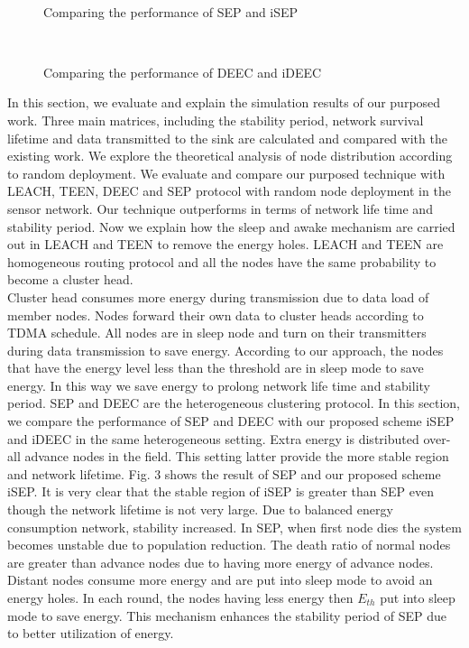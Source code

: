 \documentclass{article}
\begin{document}
\begin{figure}
\centering
\mbox{\quad
{}}
\caption{Comparing the performance of SEP and iSEP} \label{fig12}
\end{figure}
\begin{figure}
\centering
\mbox{\quad
{}}
\caption{Comparing the performance of DEEC and iDEEC} \label{fig12}
\end{figure}
In this section, we evaluate and explain the simulation results of our purposed work. Three main matrices, including the stability period, network survival lifetime and data transmitted to the sink are calculated and compared with the existing work. We explore the theoretical analysis of node distribution according to random deployment. We evaluate and compare our purposed technique with LEACH, TEEN, DEEC and SEP protocol with random node deployment in the sensor network. Our technique outperforms in terms of network life time and stability period. Now we explain how the sleep and awake mechanism are carried out in LEACH and TEEN to remove the energy holes. LEACH and TEEN are homogeneous routing protocol and all the nodes have the same probability to become a cluster head. \\Cluster head consumes more energy during transmission due to data load of member nodes. Nodes forward their own data to cluster heads according to TDMA schedule. All nodes are in sleep node and turn on their transmitters during data transmission to save energy. According to our approach, the nodes that have the energy level less than the threshold are in sleep mode to save energy. In this way we save energy to prolong network life time and stability period.
SEP and DEEC are the heterogeneous clustering protocol. In this section, we compare the performance of SEP and DEEC with our proposed scheme iSEP and iDEEC in the same heterogeneous setting. Extra energy is distributed over-all advance nodes in the field. This setting latter provide the more stable region and network lifetime. Fig. 3 shows the result of SEP and our proposed scheme iSEP. It is very clear that the stable region of iSEP is greater than SEP even though the network lifetime is not very large. Due to balanced energy consumption network, stability increased. In SEP, when first node dies the system becomes unstable due to population reduction. The death ratio of normal nodes are greater than advance nodes due to having more energy of advance nodes. Distant nodes consume more energy and are put into sleep mode to avoid an energy holes. In each round, the nodes having less energy then $E_{th}$ put into sleep mode to save energy. This mechanism enhances the stability period of SEP due to better utilization of energy.
\end{document}
